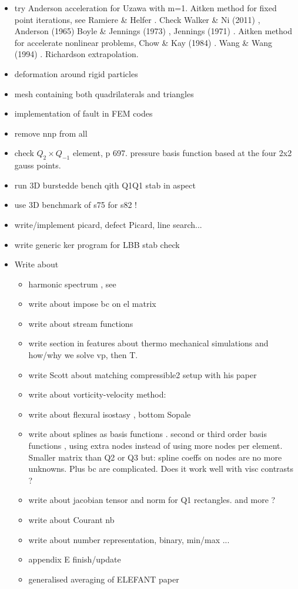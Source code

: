 \begin{itemize}
\item try Anderson acceleration for Uzawa \cite{hoow17} with m=1. Aitken method for 
fixed point iterations, see Ramiere \& Helfer \cite{rahe15}.
Check Walker \& Ni (2011) \cite{wani11}, Anderson (1965) \cite{ande65}
Boyle \& Jennings (1973) \cite{boje73}, Jennings (1971) \cite{jenn71}.
Aitken method for accelerate nonlinear problems, Chow \& Kay (1984) \cite{chka84}.
Wang \& Wang (1994) \cite{wawa94}. Richardson extrapolation. 
\item deformation around rigid particles \cite{ilma93}
\item mesh containing both quadrilaterals and triangles \cite{anbr80}
\item implementation of fault in FEM codes \cite{zhgu94,zhgu95}
\item remove nnp from all \stones
\item check $Q_2 \times Q_{-1}$ element, \cite{grsa} p 697. pressure basis function based at the four 2x2 gauss points.
\item run 3D burstedde bench qith Q1Q1 stab in aspect
\item use 3D benchmark of s75 for s82 !
\item write/implement picard, defect Picard, line search...
\item write generic ker program for LBB stab check
\item Write about

  \begin{itemize}
  \item harmonic spectrum , see \cite{ribr99}
  \item write about impose bc on el matrix
  \item write about stream functions 
  \item write section in features about thermo mechanical simulations and how/why we solve vp, then T.
  \item write Scott about matching compressible2 setup with his paper
  \item write about vorticity-velocity method: \cite{gats91,gust93,dehu95,ergq99,amct04,spez87}
  \item write about flexural isostasy \cite{maie12}, bottom Sopale
  \item write about splines as basis functions \cite{chri92}. second or third order basis functions , using extra nodes instead of using more nodes per element. 
  Smaller matrix than Q2 or Q3 but: spline coeffs on nodes are no more unknowns. Plus bc are complicated. Does it work well with visc contrasts ?
  \item write about jacobian tensor and norm for Q1 rectangles. and more ?
  \item write about Courant nb
  \item write about number representation, binary, min/max ... 
  \item appendix E finish/update
  \item generalised averaging of ELEFANT paper
  \it
  \end{itemize}
\end{itemize}

